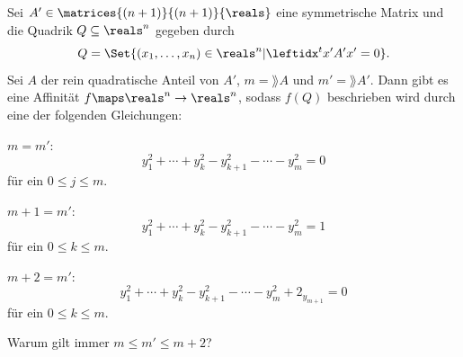 \begin{satz}\label{affine_hauptachsentranformation_reelle_quadriken}
  Sei \( A'\in \matrices{(n+1)}{(n+1)}{\reals} \) eine symmetrische Matrix und die Quadrik \( Q\subseteq \reals^n \) gegeben durch
  \begin{equation*}
    Q=\Set{(x_1,\dotsc,x_n)\in \reals^n|\transpose{x'}A'x'=0}.
  \end{equation*}
  Sei \( A \) der rein quadratische Anteil von \( A' \), \( m=\rang A \) und \( m'=\rang A' \). Dann gibt es eine Affinität \( f\maps \reals^n\to \reals^n \), sodass \( f(Q) \) beschrieben wird durch eine der folgenden Gleichungen:
  \begin{eigenschaftenenumerate}
    \item \( m=m' \):
    \begin{equation*}
      y_1^2+\dotsb+y_k^2-y_{k+1}^2-\dotsb-y_m^2=0
    \end{equation*}
    für ein \( 0\leq j \leq m \).
    \item \( m+1=m' \):
    \begin{equation*}
      y_1^2+\dotsb+y_k^2-y_{k+1}^2-\dotsb-y_m^2=1
    \end{equation*}
    für ein \( 0\leq k \leq m \).
    \item \( m+2=m' \):
    \begin{equation*}
      y_1^2+\dotsb+y_k^2-y_{k+1}^2-\dotsb-y_m^2+2_{y_{m+1}}=0
    \end{equation*}
    für ein \( 0\leq k\leq m \).
  \end{eigenschaftenenumerate} 
\end{satz}
\begin{frageuebung}
  Warum gilt immer \( m\leq m'\leq m+2 \)?
\end{frageuebung}
